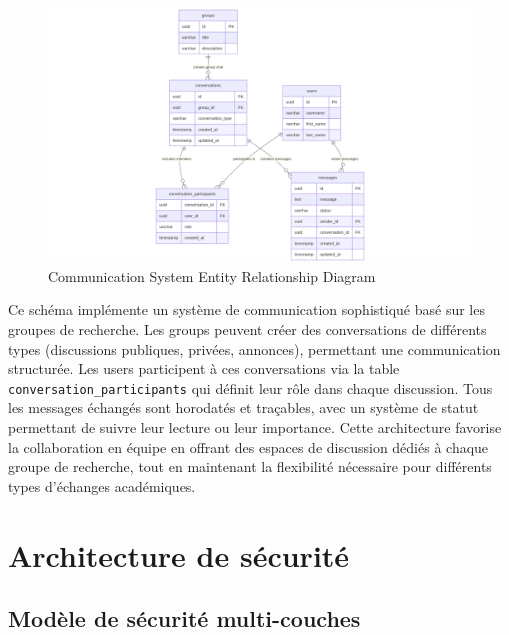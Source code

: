 \documentclass{rapportPfe}
\begin{document}
\begin{figure}[htbp]
    \centering
    \includegraphics[width=1.0\textwidth]{diagrams/diagram8.png}
    \caption{Communication System Entity Relationship Diagram}
    \label{fig:diagram5}
\end{figure}

Ce schéma implémente un système de communication sophistiqué basé sur les groupes de recherche. Les groups peuvent créer des conversations de différents types (discussions publiques, privées, annonces), permettant une communication structurée. Les users participent à ces conversations via la table \texttt{conversation\_participants} qui définit leur rôle dans chaque discussion. Tous les messages échangés sont horodatés et traçables, avec un système de statut permettant de suivre leur lecture ou leur importance. Cette architecture favorise la collaboration en équipe en offrant des espaces de discussion dédiés à chaque groupe de recherche, tout en maintenant la flexibilité nécessaire pour différents types d'échanges académiques.

\FloatBarrier
\newpage
\section{Architecture de sécurité}

\subsection{Modèle de sécurité multi-couches}
\end{document}
